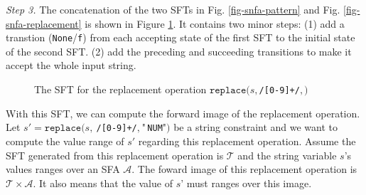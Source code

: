 \documentclass[a4paper,UKenglish,cleveref, autoref, anonymous, thm-restate]{lipics-v2021}
\begin{document}
\noindent\emph{Step 3.}
The concatenation of the two SFTs in Fig. \ref{fig-snfa-pattern} and Fig. \ref{fig-snfa-replacement} is shown in Figure \ref{fig-rearranged-automata}. It contains two minor steps: (1) add a transtion (\texttt{None}/\texttt{f}) from each accepting state of the first SFT to the initial state of the second SFT. (2) add the preceding and succeeding transitions to make it accept the whole input string.

\begin{figure}[h] \centering
  \caption{The SFT for the replacement operation $\texttt{replace}(s, $\texttt{/[0-9]+/}$, $$)$}
  \label{fig-rearranged-automata}
  \end{figure}

  With this SFT, we can compute the forward image of the replacement operation.
  Let $s' = \texttt{replace}(s,~$\texttt{/[0-9]+/}$,~\text{"}$\texttt{NUM}$\text{"})$ be a string constraint and we want to compute the value range of $s'$ regarding this replacement operation.
  Assume the SFT generated from this replacement operation is $\mathcal{T}$ and the string variable $s$'s values ranges over an SFA $\mathcal{A}$. The foward image of this replacement operation is $\mathcal{T}\times \mathcal{A}$. It also means that the value of $s$' must ranges over this image.
\end{document}
